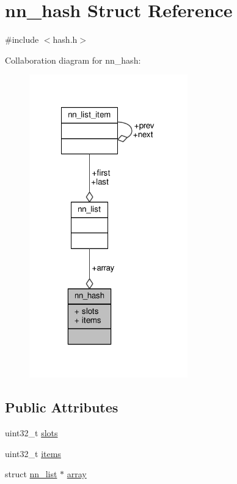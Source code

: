 \hypertarget{structnn__hash}{}\section{nn\+\_\+hash Struct Reference}
\label{structnn__hash}


{\ttfamily \#include $<$hash.\+h$>$}



Collaboration diagram for nn\+\_\+hash\+:\nopagebreak
\begin{figure}[H]
\begin{center}
\leavevmode
\includegraphics[width=194pt]{structnn__hash__coll__graph}
\end{center}
\end{figure}
\subsection*{Public Attributes}
\begin{DoxyCompactItemize}
\item 
uint32\+\_\+t \hyperlink{structnn__hash_a09c079149c424febf2b1cc5f639eaeac}{slots}
\item 
uint32\+\_\+t \hyperlink{structnn__hash_ad68a8fd4c0707eddc75558b3de0b8ff9}{items}
\item 
struct \hyperlink{structnn__list}{nn\+\_\+list} $\ast$ \hyperlink{structnn__hash_a2ba7047174afe682c1613286020015e4}{array}
\end{DoxyCompactItemize}


